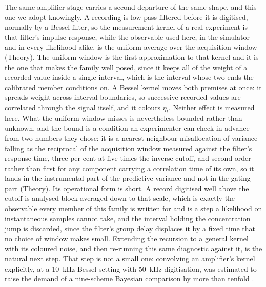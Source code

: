 The same amplifier stage carries a second departure of the same shape, and this one we adopt knowingly. A recording is low-pass filtered before it is digitised, normally by a Bessel filter, so the measurement kernel of a real experiment is that filter's impulse response, while the observable used here, in the simulator and in every likelihood alike, is the uniform average over the acquisition window (Theory). The uniform window is the first approximation to that kernel and it is the one that makes the family well posed, since it keeps all of the weight of a recorded value inside a single interval, which is the interval whose two ends the calibrated member conditions on. A Bessel kernel moves both premises at once: it spreads weight across interval boundaries, so successive recorded values are correlated through the signal itself, and it colours $\eta_t$. Neither effect is measured here. What the uniform window misses is nevertheless bounded rather than unknown, and the bound is a condition an experimenter can check in advance from two numbers they chose: it is a nearest-neighbour misallocation of variance falling as the reciprocal of the acquisition window measured against the filter's response time, three per cent at five times the inverse cutoff, and second order rather than first for any component carrying a correlation time of its own, so it lands in the instrumental part of the predictive variance and not in the gating part (Theory). Its operational form is short. A record digitised well above the cutoff is analysed block-averaged down to that scale, which is exactly the observable every member of this family is written for and is a step a likelihood on instantaneous samples cannot take, and the interval holding the concentration jump is discarded, since the filter's group delay displaces it by a fixed time that no choice of window makes small. Extending the recursion to a general kernel with its coloured noise, and then re-running this same diagnostic against it, is the natural next step. That step is not a small one: convolving an amplifier's kernel explicitly, at a \SI{10}{\kilo\hertz} Bessel setting with \SI{50}{\kilo\hertz} digitisation, was estimated to raise the demand of a nine-scheme Bayesian comparison by more than tenfold \cite{moffatt2025bayesian}. %
